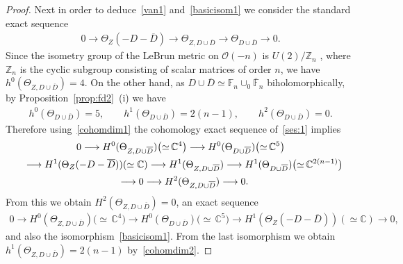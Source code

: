 \documentclass[pdftex]{sigma}
\numberwithin{equation}{section}
\begin{document}
\begin{proof}
Next in order to deduce~\eqref{van1} and~\eqref{basicisom1} we consider the standard exact sequence
\begin{gather}
\label{ses:1}
0
\longrightarrow
\Theta_Z(-D-\overline D)
\longrightarrow
\Theta_{Z, D\cup\overline D}
\longrightarrow
\Theta_{D\cup \overline D}
\longrightarrow
0.
\end{gather}
Since the isometry group of the LeBrun metric on $\mathscr O(-n)$ is $U(2)/\mathbb{Z}_n$ \cite{LB88}, where
$\mathbb{Z}_n$ is the cyclic subgroup consisting of scalar matrices of order $n$, we have $ h^0 ( \Theta_{Z,
D\cup\overline D}) = 4.
$ On the other hand, as $D\cup \overline D\simeq \mathbb{F}_n\cup_0\overline{\mathbb{F}}_n$ biholomorphically, by
Proposition~\ref{prop:fd2}~(i) we have
\begin{gather}
\label{cohomdim2}
h^0 ( \Theta_{D\cup\overline D}) = 5,
\qquad
h^1 ( \Theta_{D\cup\overline D}) = 2(n-1),
\qquad
h^2 ( \Theta_{D\cup\overline D}) = 0.
\end{gather}
Therefore using~\eqref{cohomdim1} the cohomology exact sequence of~\eqref{ses:1} implies
\begin{gather}
\label{les:1}
0
\longrightarrow
H^0(\Theta_{Z, D\cup\overline D})
\big({\simeq}\,\mathbb{C}^4\big)
\longrightarrow
H^0(\Theta_{D\cup \overline D})
\big({\simeq}\, \mathbb{C}^5\big)
\nonumber
\\
\hphantom{0}{}
\longrightarrow
H^1(\Theta_Z(-D-\overline D))
(\simeq \mathbb{C})
\longrightarrow
H^1(\Theta_{Z, D\cup\overline D})
\longrightarrow
H^1(\Theta_{D\cup \overline D})
\big({\simeq}\, \mathbb{C}^{2(n-1)}\big)
\nonumber
\\
\hphantom{0}{}
\longrightarrow
0
\longrightarrow
H^2(\Theta_{Z, D\cup\overline D})
\longrightarrow
0.
\end{gather}
From this we obtain $H^2( \Theta_{Z, D\cup\overline D}) = 0$, an exact sequence
\begin{gather}
\label{LB:key}
0
\longrightarrow
H^0(\Theta_{Z,D\cup\overline D})
\big({\simeq}\, \mathbb{C}^4\big)
\longrightarrow
H^0(\Theta_{D\cup \overline D})
\big({\simeq}\, \mathbb{C}^5\big)
\longrightarrow
H^1( \Theta_Z(-D-\overline D))
(\simeq \mathbb{C})
\longrightarrow
0,\!\!\!\!
\end{gather}
and also the isomorphism~\eqref{basicisom1}.
From the last isomorphism we obtain $h^1(\Theta_{Z,D\cup\overline D}) = 2(n-1)$ by~\eqref{cohomdim2}.


\end{proof}
\end{document}
